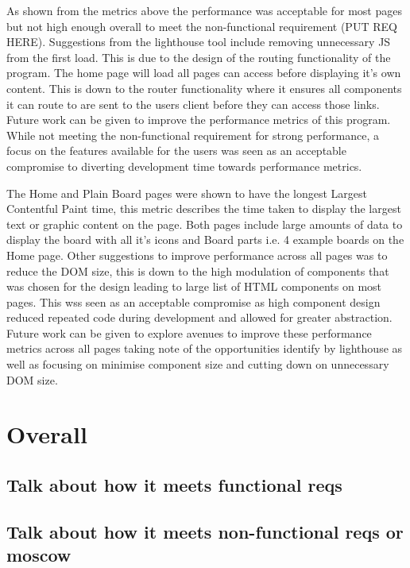 \documentclass{l4proj}
\begin{document}
As shown from the metrics above the performance was acceptable for most pages but not high enough overall to meet the non-functional requirement (PUT REQ HERE). Suggestions from the lighthouse tool include removing unnecessary JS from the first load. This is due to the design of the routing functionality of the program. The home page will load all pages can access before displaying it's own content. This is down to the router functionality where it ensures all components it can route to are sent to the users client before they can access those links. Future work can be given to improve the performance metrics of this program. While not meeting the non-functional requirement for strong performance, a focus on the features available for the users was seen as an acceptable compromise to diverting development time towards performance metrics. 

The Home and Plain Board pages were shown to have the longest Largest Contentful Paint time, this metric describes the time taken to display the largest text or graphic content on the page. Both pages include large amounts of data to display the board with all it's icons and Board parts i.e. 4 example boards on the Home page. Other suggestions to improve performance across all pages was to reduce the DOM size, this is down to the high modulation of components that was chosen for the design leading to large list of HTML components on most pages. This wss seen as an acceptable compromise as high component design reduced repeated code during development and allowed for greater abstraction. Future work can be given to explore avenues to improve these performance metrics across all pages taking note of the opportunities identify by lighthouse as well as focusing on minimise component size and cutting down on unnecessary DOM size.   

\section{Overall}
\subsection{Talk about how it meets functional reqs}
\subsection{Talk about how it meets non-functional reqs or moscow}
\end{document}
